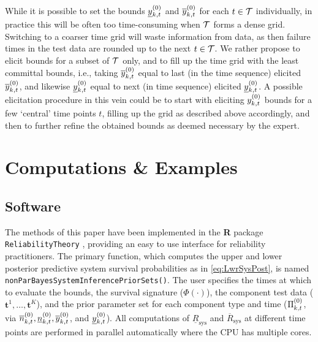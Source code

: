 \documentclass[12pt, a4paper]{elsarticle}
\newcommand{\bs}[1]{\boldsymbol{#1}}
\renewcommand{\vec}[1]{{\bs#1}}
\newcommand{\ul}[1]{\underline{#1}}
\newcommand{\ol}[1]{\overline{#1}}
\newcommand{\Rsys}{R_\text{sys}}
\newcommand{\lRsys}{\ul{R}_\text{sys}}
\newcommand{\uRsys}{\ol{R}_\text{sys}}
\begin{document}
While it is possible to set the bounds $\yktzl$ and $\yktzu$ for each $t \in {\cal T}$ individually,
in practice this will be often too time-consuming when ${\cal T}$ forms a dense grid.
Switching to a coarser time grid will waste information from data,
as then failure times in the test data are rounded up to the next $t \in {\cal T}$.
We rather propose to elicit bounds for a subset of ${\cal T}$ only,
and to fill up the time grid with the least committal bounds, i.e.,
taking $\yktzu$ equal to last (in the time sequence) elicited $\yktzu$,
and likewise $\yktzl$ equal to next (in time sequence) elicited $\yktzl$.
A possible elicitation procedure in this vein could be
to start with eliciting $y^{(0)}_{k,t}$ bounds for a few `central' time points $t$,
filling up the grid as described above accordingly,
and then to further refine the obtained bounds as deemed necessary by the expert.


\section{Computations \& Examples}


\subsection{Software}

The methods of this paper have been implemented in the \textbf{R}
\citep{R} package \texttt{ReliabilityTheory} \citep{2015:aslett-RT},
providing an easy to use interface for reliability practitioners.  The
primary function, which computes the upper and lower posterior
predictive system survival probabilities as in \eqref{eq:LwrSysPost}, is
named \texttt{nonParBayesSystemInferencePriorSets()}.  The user
specifies the times at which to evaluate the bounds, the survival
signature ($\Phi(\cdot)$), the component test data ($\vec{t}^1, \ldots,
\vec{t}^K$), and the prior parameter set for each component type and
time ($\Pi^{(0)}_{k,t}$, via $\nzu_{k,t}, \nzl_{k,t}, \yzu_{k,t}$, and
$\yzl_{k,t}$).  All computations of $\lRsys$
and $\uRsys$ at different time points are performed in parallel
automatically where the CPU has multiple cores.
\end{document}
